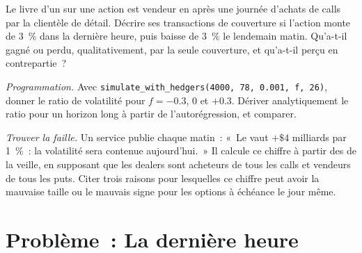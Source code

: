 \begin{exercise}[$\star\star$]\label{exo:m1:zero-day-options-and-retail-flow:6}
Le livre d'un  sur une action est vendeur en  après une journée
d'achats de calls par la clientèle de détail. Décrire ses transactions de couverture si l'action
monte de 3~\% dans la dernière heure, puis baisse de 3~\% le lendemain matin. Qu'a-t-il gagné
ou perdu, qualitativement, par la seule couverture, et qu'a-t-il perçu en contrepartie~?
\end{exercise}

\begin{exercise}[$\star\star\star$]\label{exo:m1:zero-day-options-and-retail-flow:7}
\emph{Programmation.} Avec \texttt{simulate\_with\_hedgers(4000, 78, 0.001, f, 26)},
donner le ratio de volatilité pour $f = -0.3$, 0 et $+0.3$. Dériver analytiquement le ratio pour
un horizon long à partir de l'autorégression, et comparer.
\end{exercise}

\begin{exercise}[$\star\star\star$]\label{exo:m1:zero-day-options-and-retail-flow:8}
\emph{Trouver la faille.} Un service publie chaque matin~: «~Le  vaut
$+\$4$ milliards par 1~\%~: la volatilité sera contenue aujourd'hui.~» Il calcule ce chiffre à partir
des  de la veille, en supposant que les dealers sont acheteurs de tous les calls
et vendeurs de tous les puts. Citer trois raisons pour lesquelles ce chiffre peut avoir la mauvaise
taille ou le mauvais signe pour les options à échéance le jour même.
\end{exercise}

\section{Problème~: La dernière heure}

